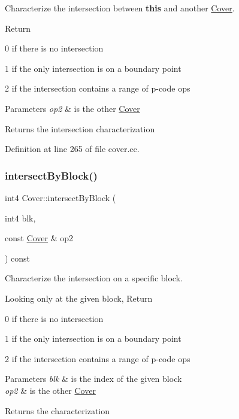 Characterize the intersection between {\bfseries{this}} and another \mbox{\hyperlink{class_cover}{Cover}}. 

Return
\begin{DoxyItemize}
\item 0 if there is no intersection
\item 1 if the only intersection is on a boundary point
\item 2 if the intersection contains a range of p-\/code ops
\end{DoxyItemize}


\begin{DoxyParams}{Parameters}
{\em op2} & is the other \mbox{\hyperlink{class_cover}{Cover}} \\
\hline
\end{DoxyParams}
\begin{DoxyReturn}{Returns}
the intersection characterization 
\end{DoxyReturn}


Definition at line 265 of file cover.\+cc.

\mbox{\label{class_cover_acdd4be001eb6eda1bf9c6fe35c834736}} 
\subsubsection{\texorpdfstring{intersectByBlock()}{intersectByBlock()}}
{\footnotesize\ttfamily int4 Cover\+::intersect\+By\+Block (\begin{DoxyParamCaption}\item[{int4}]{blk,  }\item[{const \mbox{\hyperlink{class_cover}{Cover}} \&}]{op2 }\end{DoxyParamCaption}) const}



Characterize the intersection on a specific block. 

Looking only at the given block, Return
\begin{DoxyItemize}
\item 0 if there is no intersection
\item 1 if the only intersection is on a boundary point
\item 2 if the intersection contains a range of p-\/code ops
\end{DoxyItemize}


\begin{DoxyParams}{Parameters}
{\em blk} & is the index of the given block \\
\hline
{\em op2} & is the other \mbox{\hyperlink{class_cover}{Cover}} \\
\hline
\end{DoxyParams}
\begin{DoxyReturn}{Returns}
the characterization 
\end{DoxyReturn}


